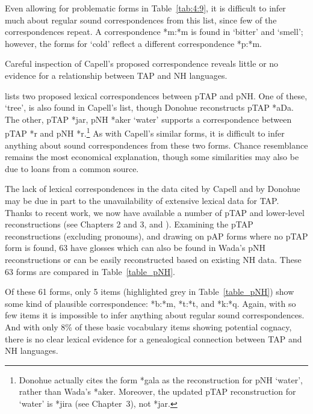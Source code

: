 Even allowing for problematic forms in Table~\ref{tab:4:9}, it is difficult to infer much about regular sound correspondences from this list, since few of the correspondences repeat. A correspondence *m:*m is found in `bitter' and `smell'; however, the forms for `cold' reflect a different correspondence *p:*m. 

Careful inspection of Capell's proposed correspondence reveals little or no evidence for a relationship between TAP and NH languages.

\citet{Donohue2008boundpron} lists two proposed lexical correspondences between pTAP and pNH. One of these, `tree', is also found in Capell's list, though Donohue reconstructs pTAP *aDa. The other, pTAP *jar, pNH *aker `water' supports a correspondence between pTAP *r and pNH *r.\footnote{Donohue actually cites the form *gala as the reconstruction for pNH `water', rather than Wada's *aker. Moreover, the updated pTAP reconstruction for `water' is *jira (see Chapter~3), not *jar.} As with Capell's similar forms, it is difficult to infer anything about sound correspondences from these two forms. Chance resemblance remains the most economical explanation, though some similarities may also be due to loans from a common source.


The lack of lexical correspondences in the data cited by Capell and by Donohue may be due in part to the unavailability of extensive lexical data for TAP. Thanks to recent work, we now have available a number of pTAP and lower-level reconstructions (see Chapters 2 and 3, and \citealt{SchapperEtAl2012historical}). Examining the pTAP reconstructions (excluding pronouns), and drawing on pAP forms where no pTAP form is found, 63 have glosses which can also be found in Wada's \citeyearpar{Wada1980} pNH reconstructions or can be easily reconstructed based on existing NH data. These 63 forms are compared in Table~\ref{table_pNH}. 
 
Of these 61 forms, only 5 items (highlighted grey in Table~\ref{table_pNH}) show some kind of plausible correspondence: *b:*m, *t:*t, and *k:*q. Again, with so few items it is impossible to infer anything about regular sound correspondences. And with only 8\% of these basic vocabulary items showing potential cognacy, there is no clear lexical evidence for a genealogical connection between TAP and NH languages.

